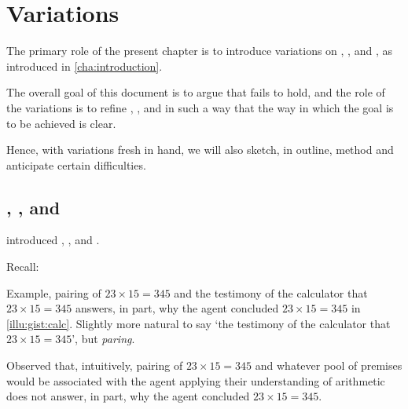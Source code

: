 \chapter{Variations}
\label{cha:var}

\begin{note}
  The primary role of the present chapter is to introduce variations on \qWhy{}, \qHow{}, and \issueInclusion{}, as introduced in \autoref{cha:introduction}.

  The overall goal of this document is to argue that \issueInclusion{} fails to hold, and the role of the variations is to refine \qWhy{}, \qHow{}, and \issueInclusion{} in such a way that the way in which the goal is to be achieved is clear.

  Hence, with variations fresh in hand, we will also sketch, in outline, method and anticipate certain difficulties.
\end{note}

\section{\qWhy{}, \qHow{}, and \issueInclusion{}}
\label{cha:var:sec:q-no-v}

\begin{note}
   introduced \qWhy{}, \qHow{}, and \issueInclusion{}.

  Recall:
  \vspace{-\baselineskip}
  \begin{quote}
    \questionWhyBasic*
  \end{quote}

  \begin{quote}
    \questionHowBasic*
  \end{quote}

  \begin{quote}
    \issueInclusionFirst*
  \end{quote}
\end{note}

\begin{note}
    Example, pairing of \(23 \times 15 = 345\) and the testimony of the calculator that \(23 \times 15 = 345\) answers, in part, why the agent concluded \(23 \times 15 = 345\) in \autoref{illu:gist:calc}.
    Slightly more natural to say `the testimony of the calculator that \(23 \times 15 = 345\)', but \emph{paring}.

    Observed that, intuitively, pairing of \(23 \times 15 = 345\) and whatever pool of premises would be associated with the agent applying their understanding of arithmetic does not answer, in part, why the agent concluded \(23 \times 15 = 345\).
\end{note}

